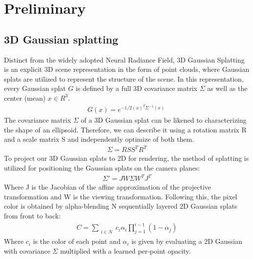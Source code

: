 \section{Preliminary}
\subsection{3D Gaussian splatting}
\label{sec:related_work}
Distinct from the widely adopted
Neural Radiance Field, 3D Gaussian Splatting is an explicit 3D scene representation in the form of point clouds, where Gaussian splats are utilized to represent the structure of the scene. In this representation, every Gaussian splat $G$ is defined by a full 3D covariance matrix $\Sigma$ as well as the center (mean) $x \in R^3$.
\begin{align}
    G(x)=e^{-1/2(x)^T\Sigma^{-1}(x)} \
\end{align}
The covariance matrix $\Sigma$ of a 3D Gaussian splat can be likened to characterizing the shape of an ellipsoid. Therefore, we can describe it using a rotation matrix R and a scale matrix S and independently optimize of both them. 
\begin{align}
    \Sigma=RSS^TR^T
\end{align}
 To project our 3D Gaussian splats to 2D for rendering, the method of splatting  is utilized for positioning the Gaussian splats
on the camera planes:
\begin{align}
    \Sigma'=JW\Sigma W^TJ^T
\end{align}
Where J is the Jacobian of the affine approximation of the projective transformation and W is the viewing transformation.
Following this, the pixel color is obtained by alpha-blending N sequentially layered 2D Gaussian splats from front to back:
\begin{align}
    C=\sum_{\substack{i\in N}}c_{i}\alpha_{i}\prod_{j=1}^{i-1}(1-\alpha_{j}) \label{point rendering}
\end{align}
Where $c_{i}$ is the color of each point and $\alpha_{i}$
is given by evaluating a 2D Gaussian with covariance $\Sigma$ multiplied with a learned per-point opacity.
